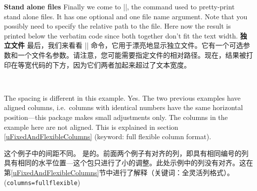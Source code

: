 \begin{paracol}{2}
\textbf{Stand alone files}
Finally we come to ||, the command used to pretty-print
stand alone files. It has one optional and one file name argument.
Note that you possibly need to specify the relative path to the file.
Here now the result is printed below the verbatim code since both together
don't fit the text width.
\switchcolumn
\textbf{独立文件}
最后，我们来看看 || 命令，它用于漂亮地显示独立文件。它有一个可选参数和一个文件名参数。请注意，您可能需要指定文件的相对路径。现在，结果被打印在等宽代码的下方，因为它们两者加起来超过了文本宽度。
\begin{lstsample}{\lstset{comment=[l]\%,columns=fullflexible}}^^A
            {\lstset{alsoletter=\\,emph=\,emphstyle=\rstyle}^^A
            \lstaspectindex{}{}}
        
\end{lstsample}

\end{paracol}

\begin{advise}
    \begin{paracol}{2}
\item The spacing is different in this example.
      \advisespace
      Yes. The two previous examples have aligned columns, i.e.~columns with
      identical numbers have the same horizontal position---this package
      makes small adjustments only. The columns in the example here are not
      aligned. This is explained in section \ref{uFixedAndFlexibleColumns}
      (keyword: full flexible column format).
\switchcolumn
\item 这个例子中的间距不同。
\advisespace
是的。前面两个例子有对齐的列，即具有相同编号的列具有相同的水平位置---这个包只进行了小的调整。此处示例中的列没有对齐。这在第\ref{uFixedAndFlexibleColumns}节中进行了解释（关键词：全灵活列格式）。(\verb|columns=fullflexible|)
    \end{paracol}
\end{advise}

